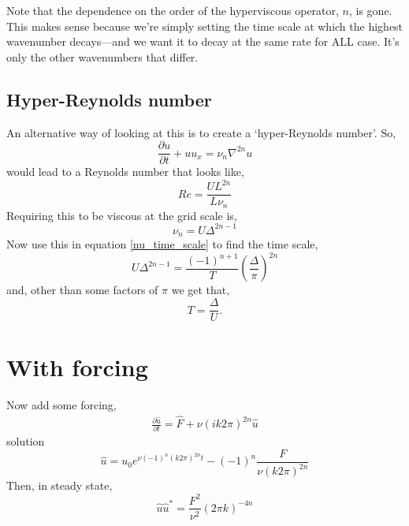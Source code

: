 \documentclass[11pt, oneside]{article}   	%
\begin{document}
Note that the dependence on the order of the hyperviscous operator, $n$, is gone. This makes sense because we're simply setting the time scale at which the highest wavenumber decays---and we want it to decay at the same rate for ALL case. It's only the other wavenumbers that differ.


\subsection{Hyper-Reynolds number}
An alternative way of looking at this is to create a `hyper-Reynolds number'. So,
\begin{equation}
\frac{\partial u}{\partial t} + u u_x = \nu_n \nabla^{2n} u
\end{equation}
would lead to a Reynolds number that looks like,
\begin{equation}
Re = \frac{U L^{2n}}{L \nu_n}
\end{equation}
Requiring this to be viscous at the grid scale is,
\begin{equation}
\nu_n = U \Delta^{2n-1}
\end{equation}
Now use this in equation \ref{nu_time_scale} to find the time scale,
\begin{equation}
 U \Delta^{2n-1} = \frac{(-1)^{n+1}}{T} \left( \frac{\Delta}{\pi} \right)^{2n}
\end{equation}
and, other than some factors of $\pi$ we get that,
\begin{equation}
T = \frac{\Delta}{U}.
\end{equation}

%
\section{With forcing}
%

Now add some forcing,
\begin{align}
\frac{\partial \hat{u}}{\partial t} = \hat{F} +  \nu (i k 2 \pi)^{2n} \hat{u}
\end{align}
solution
\begin{equation}
\hat{u} = u_0 e^{\nu (-1)^n (k 2 \pi)^{2n} t} - (-1)^n \frac{F}{ \nu (k 2 \pi)^{2n}}
\end{equation}
Then, in steady state,
\begin{equation}
\hat{u}\hat{u}^\ast =  \frac{F^2}{ \nu^2 } (2 \pi k )^{-4n}
\end{equation}
\end{document}
